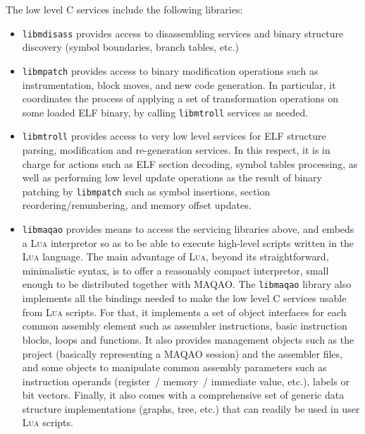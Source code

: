 \documentclass[11pt, a4paper, twoside]{montblanc2}
\def\lua{\textsc{Lua}\xspace}
\begin{document}
The low level C services include the following libraries:
\begin{itemize}
  \item \texttt{libmdisass} provides access to disassembling services and binary 
    structure discovery (symbol boundaries, branch tables, etc.)

  \item \texttt{libmpatch} provides access to binary modification operations 
    such as instrumentation, block moves, and new code generation. In particular, 
    it coordinates the process of applying a set of transformation operations on 
    some loaded ELF binary, by calling \texttt{libmtroll} services as needed.

  \item \texttt{libmtroll} provides access to very low level services for ELF 
    structure parsing, modification and re-generation services. In this respect, 
    it is in charge for actions such as ELF section decoding, symbol tables 
    processing, as well as performing low level update operations as the result 
    of binary patching by \texttt{libmpatch} such as symbol insertions, section reordering/renumbering, and 
    memory offset updates.

  \item \texttt{libmaqao} provides means to access the servicing libraries 
    above, and embeds a \lua interpretor so as to be able to execute high-level 
    scripts written in the \lua language. The main advantage of \lua, beyond its 
    straightforward, minimalistic syntax, is to offer a reasonably compact 
    interpretor, small enough to be distributed together with MAQAO. The 
    \texttt{libmaqao} library also implements all the bindings needed to make 
    the low level C services usable from \lua scripts. For that, it implements a 
    set of object interfaces for each common assembly element such as 
    assembler instructions, basic instruction blocks, loops and functions. It also 
    provides management objects such as the project (basically representing a 
    MAQAO session) and the assembler files, and some objects to manipulate common 
    assembly parameters such as instruction operands (register~/ memory~/ 
    immediate value, etc.), labels or bit vectors. Finally, it also comes with a 
    comprehensive set of generic data structure implementations (graphs, tree, 
    etc.) that can readily be used in user \lua scripts.

\end{itemize}
\end{document}
